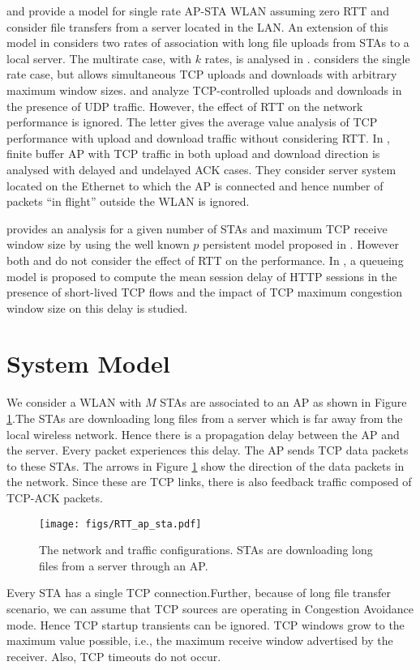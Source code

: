 \documentclass[conference]{IEEEtran}
\begin{document}
\cite{astn_model:Kuriakose} and \cite{astn_model:Bruno4} provide a model for
single rate AP-STA WLAN assuming zero RTT and consider file transfers from
a server located in the LAN. An extension of this model in 
\cite{astn_model:Krusheel} considers two rates of association with long 
file uploads from STAs to a local server. The multirate case, with $k$ rates,
is analysed in \cite{astn_model:pradeep_kuri}. \cite{astn_model:pradeep_kuri2}
considers the single rate case, but allows simultaneous TCP uploads and
downloads with arbitrary maximum window sizes. 
\cite{astn_model:Bruno1} and \cite{astn_model:Bruno2} analyze TCP-controlled 
uploads and downloads in the presence of UDP traffic. However, the effect
of RTT on the network performance is ignored. 
The letter \cite{astn_model:Bruno3} gives the average value analysis of TCP 
performance with upload and download traffic without considering RTT.
In \cite{astn_model:Onkar}, finite buffer AP with TCP traffic in both upload and
download direction is analysed with delayed and undelayed ACK cases. They 
consider server system located on the Ethernet to which the AP is connected 
and hence number of packets ``in flight'' outside the WLAN is ignored. 

\cite{astn_model:Yu} provides an analysis for a given number of STAs and maximum
TCP receive window size by using the well known $p$ persistent model proposed
in \cite{astn_model:Cali}. However both \cite{astn_model:Yu} and 
\cite{astn_model:Cali} do not consider the effect of RTT on the performance.
In \cite{astn_model:Miorandi}, a queueing model is proposed to compute the mean
session delay of HTTP sessions in the presence of short-lived TCP flows and 
the impact of TCP maximum congestion window size on this delay is studied.
\section{System Model}\label{sec:System_Model}
We consider a WLAN with $M$ STAs are associated to an AP as shown
in Figure \ref{fig:AP_STAs}.The STAs are downloading long files from a server
which is far away from the local wireless network. Hence there is a propagation
delay between the AP and the
server. Every packet experiences this delay. The AP sends TCP data packets to
these STAs. The arrows in Figure \ref{fig:AP_STAs} show the direction of
the data packets in the network. Since these are TCP links, there is also
feedback traffic composed of TCP-ACK packets.
 
\begin{figure}[ht]
\centering
\texttt{[image: figs/RTT\_ap\_sta.pdf]} 
\caption{The network and traffic configurations. STAs are downloading 
long files from a server through an AP.}
\label{fig:AP_STAs}
\end{figure}
 Every STA has a single TCP connection.Further, because of long file 
transfer scenario, we can assume that TCP
sources are operating in Congestion Avoidance mode. Hence TCP startup
transients can be ignored. TCP windows grow to the maximum value possible, 
i.e., the maximum receive window advertised by the receiver.  Also, TCP 
timeouts do not occur.
\end{document}
